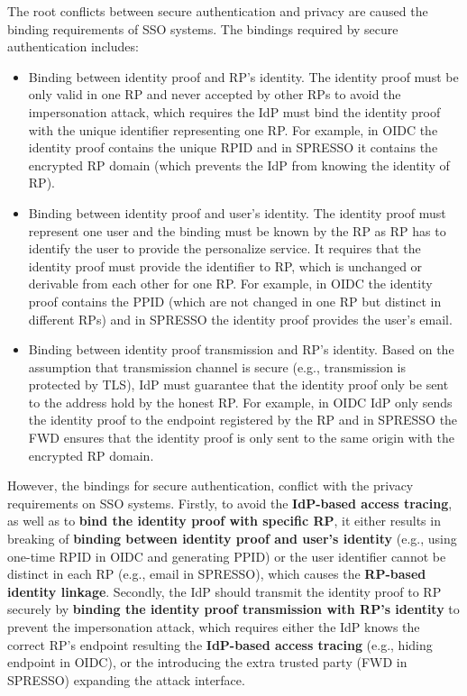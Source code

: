 {\color{red} The root conflicts between secure authentication and privacy are caused the binding requirements of SSO systems. The bindings required by secure authentication includes: 
\begin{itemize}
\item Binding between identity proof and RP's identity. The identity proof must be only valid in one RP and never accepted by other RPs to avoid the impersonation attack, which requires the IdP must bind the identity proof with the unique identifier representing one RP. For example, in OIDC the identity proof contains the unique RPID and in SPRESSO it contains the encrypted RP domain (which prevents the IdP from knowing the identity of RP).
\item Binding between identity proof and user's identity. The identity proof must represent one user and the binding must be known by the RP as RP has to identify the user to provide the personalize service. It requires that the identity proof must provide the identifier to RP, which is unchanged or derivable from each other for one RP. For example, in OIDC the identity proof contains the PPID (which are not changed in one RP but distinct in different RPs) and in SPRESSO the identity proof provides the user's email. 
\item Binding between identity proof transmission and RP's identity. Based on the assumption that transmission channel is secure (e.g., transmission is protected by TLS), IdP must guarantee that the identity proof only be sent to the address hold by the honest RP. For example, in OIDC IdP only sends the identity proof to the endpoint registered by the RP and in SPRESSO the FWD ensures that the identity proof is only sent to the same origin with the encrypted RP domain. 
\end{itemize}
 
However, the bindings for secure authentication, conflict with the privacy requirements on SSO systems. Firstly, to avoid the \textbf{IdP-based access tracing}, as well as to \textbf{bind the identity proof with specific RP}, it either results in breaking of \textbf{binding between identity proof and user's identity} (e.g., using one-time RPID in OIDC and generating PPID) or the user identifier cannot be distinct in each RP (e.g., email in SPRESSO), which causes the \textbf{RP-based identity linkage}. Secondly, the IdP should transmit the identity proof to RP securely by \textbf{binding the identity proof transmission with RP's identity} to prevent the impersonation attack, which requires either the IdP knows the correct RP's endpoint resulting the \textbf{IdP-based access tracing} (e.g., hiding endpoint in OIDC), or the introducing the extra trusted party (FWD in SPRESSO) expanding the attack interface.

 }

